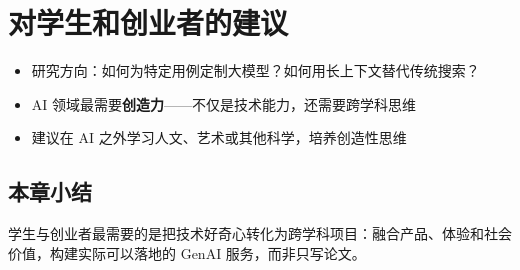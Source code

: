 \section{对学生和创业者的建议}

\begin{itemize}
    \item 研究方向：如何为特定用例定制大模型？如何用长上下文替代传统搜索？
    \item AI 领域最需要\textbf{创造力}——不仅是技术能力，还需要跨学科思维
    \item 建议在 AI 之外学习人文、艺术或其他科学，培养创造性思维
\end{itemize}

\subsection{本章小结}

学生与创业者最需要的是把技术好奇心转化为跨学科项目：融合产品、体验和社会价值，构建实际可以落地的 GenAI 服务，而非只写论文。

